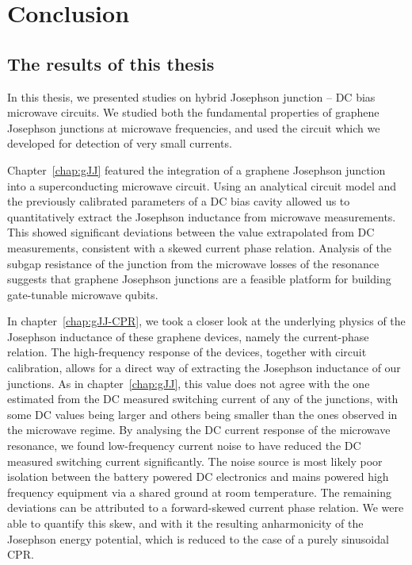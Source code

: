 \newchapstyle
\chapter{Conclusion}
\label{chap:conclusion}

\afterpage{\pagecolor{none}}\newpage

\section{The results of this thesis}
In this thesis, we presented studies on hybrid Josephson junction -- DC bias microwave circuits.
%
We studied both the fundamental properties of graphene Josephson junctions at microwave frequencies, and used the circuit which we developed for detection of very small currents.

Chapter~\ref{chap:gJJ} featured the integration of a graphene Josephson junction into a superconducting microwave circuit.
%
Using an analytical circuit model and the previously calibrated parameters of a DC bias cavity allowed us to quantitatively extract the Josephson inductance from microwave measurements.
%
This showed significant deviations between the value extrapolated from DC measurements, consistent with a skewed current phase relation.
%
Analysis of the subgap resistance of the junction from the microwave losses of the resonance suggests that graphene Josephson junctions are a feasible platform for building gate-tunable microwave qubits.

In chapter~\ref{chap:gJJ-CPR}, we took a closer look at the underlying physics of the Josephson inductance of these graphene devices, namely the current-phase relation.
%
The high-frequency response of the devices, together with circuit calibration, allows for a direct way of extracting the Josephson inductance of our junctions.
%
As in chapter~\ref{chap:gJJ}, this value does not agree with the one estimated from the DC measured switching current of any of the junctions, with some DC values being larger and others being smaller than the ones observed in the microwave regime.
%
By analysing the DC current response of the microwave resonance, we found low-frequency current noise to have reduced the DC measured switching current significantly.
%
The noise source is most likely poor isolation between the battery powered DC electronics and mains powered high frequency equipment via a shared ground at room temperature.
%
The remaining deviations can be attributed to a forward-skewed current phase relation.
%
We were able to quantify this skew, and with it the resulting anharmonicity of the Josephson energy potential, which is reduced to the case of a purely sinusoidal CPR.

